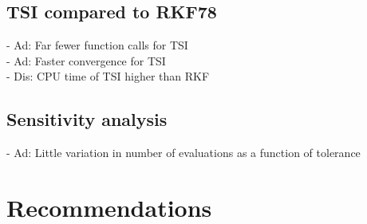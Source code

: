 



\subsection{\ac{TSI} compared to \ac{RKF78}}
\label{subsec:TSIcomparedToRKF78}
- Ad: Far fewer function calls for TSI\\
- Ad: Faster convergence for TSI\\
- Dis: CPU time of TSI higher than RKF\\


\subsection{Sensitivity analysis}
\label{subsec:sensitivityAnalysis}
- Ad: Little variation in number of evaluations as a function of tolerance

\section{Recommendations}
\label{sec:recommendations}